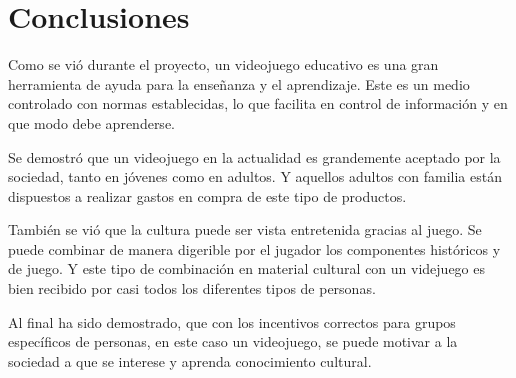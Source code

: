 \chapter{Conclusiones}


Como se vió durante el proyecto, un videojuego educativo es una gran herramienta de ayuda para la enseñanza y el aprendizaje. Este es un medio controlado con normas establecidas, lo que facilita en control de información y en que modo debe aprenderse.

Se demostró que un videojuego en la actualidad es grandemente aceptado por la sociedad, tanto en jóvenes como en adultos. Y aquellos adultos con familia están dispuestos a realizar gastos en compra de este tipo de productos. 

También se vió que la cultura puede ser vista entretenida gracias al juego. Se puede combinar de manera digerible por el jugador los componentes históricos y de juego. Y este tipo de combinación en material cultural con un videjuego es bien recibido por casi todos los diferentes tipos de personas.

Al final ha sido demostrado, que con los incentivos correctos para grupos específicos de personas, en este caso un videojuego, se puede motivar a la sociedad a que se interese y aprenda conocimiento cultural. 